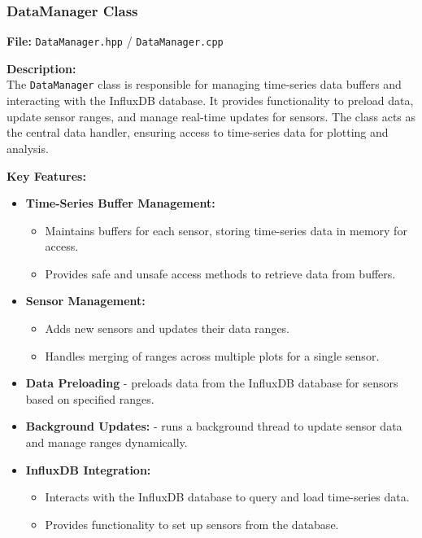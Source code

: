 \documentclass{article}
\begin{document}
\vspace{10pt}
\subsubsection{DataManager Class}
\textbf{File:} \texttt{DataManager.hpp} / \texttt{DataManager.cpp} 

\vspace{5pt}
\noindent
\textbf{Description:}
\\
\noindent
The \texttt{DataManager} class is responsible for managing time-series data buffers and interacting with the InfluxDB database. It provides functionality to preload data, update sensor ranges, and manage real-time updates for sensors. The class acts as the central data handler, ensuring access to time-series data for plotting and analysis.

\vspace{5pt}
\noindent
\textbf{Key Features:}
\begin{itemize}
    \item \textbf{Time-Series Buffer Management:}
    \begin{itemize}
        \item Maintains buffers for each sensor, storing time-series data in memory for access.

        \item Provides safe and unsafe access methods to retrieve data from buffers.
    \end{itemize}
    
    \item \textbf{Sensor Management:}
    \begin{itemize}
        \item Adds new sensors and updates their data ranges.

        \item Handles merging of ranges across multiple plots for a single sensor.
    \end{itemize}
    
    \item \textbf{Data Preloading} - preloads data from the InfluxDB database for sensors based on specified ranges.

    \item \textbf{Background Updates:} - runs a background thread to update sensor data and manage ranges dynamically.

    \item \textbf{InfluxDB Integration:}
    \begin{itemize}
        \item Interacts with the InfluxDB database to query and load time-series data.

        \item Provides functionality to set up sensors from the database.
    \end{itemize}
\end{itemize}
\end{document}
